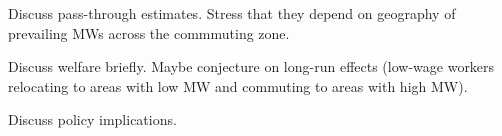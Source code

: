 
Discuss pass-through estimates. Stress that they depend on geography of prevailing
MWs across the commmuting zone.

Discuss welfare briefly. Maybe conjecture on long-run effects (low-wage workers 
relocating to areas with low MW and commuting to areas with high MW).

Discuss policy implications.
